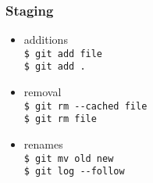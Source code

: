 \documentclass[english]{beamer}
\newcommand{\CMD}[1]{%
\texttt{\textcolor{code-blue}{#1}}%
}
\begin{document}
\begin{frame}
\frametitle{Staging}

\vspace{.1\textheight}

\begin{itemize}
        \item additions \\
                \CMD{\$ git add file} \\
                \CMD{\$ git add .} \\
                \vspace{.1\textheight}
        \item removal \\
                \CMD{\$ git rm -{}-cached file} \\
                \CMD{\$ git rm file}
                \vspace{.1\textheight}
        \item renames \\
                \CMD{\$ git mv old new} \\
                \CMD{\$ git log -{}-follow}
\end{itemize}
\end{frame}
\end{document}
